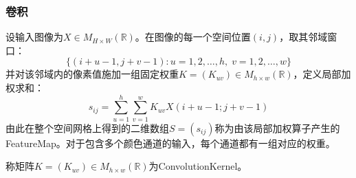 \subsubsection{卷积}
\begin{definition}
	设输入图像为$X\in M_{H\times W}(\mathbb{R})$。在图像的每一个空间位置$(i,j)$，取其邻域窗口：
	\begin{equation*}
		\{(i+u-1,j+v-1):u=1,2,\dots,h,\; v=1,2,\dots,w\}
	\end{equation*}
	并对该邻域内的像素值施加一组固定权重$K=(K_{uv})\in M_{h\times w}(\mathbb{R})$，定义局部加权求和：
	\begin{equation*}
		s_{ij}=\sum_{u=1}^h\sum_{v=1}^wK_{uv}X(i+u-1;j+v-1)
	\end{equation*}	
	由此在整个空间网格上得到的二维数组$S=(s_{ij})$称为由该局部加权算子产生的\gls{FeatureMap}。对于包含多个颜色通道的输入，每个通道都有一组对应的权重。
\end{definition}
\begin{definition}
	称矩阵$K=(K_{uv})\in M_{h\times w}(\mathbb{R})$为\gls{ConvolutionKernel}。
\end{definition}

